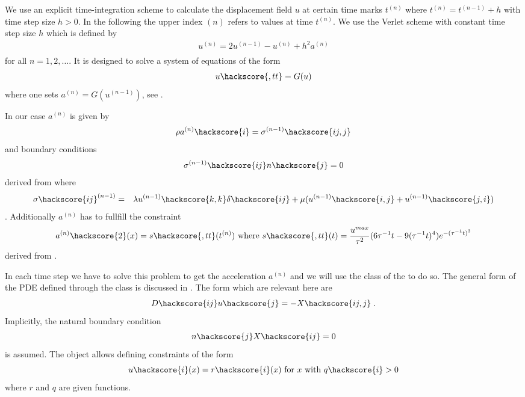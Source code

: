 We use an explicit time-integration scheme to calculate the displacement field $u$ at 
certain time marks $t^{(n)}$ where $t^{(n)}=t^{(n-1)}+h$ with time step size $h>0$. In the following the upper index ${(n)}$ refers to values at time $t^{(n)}$. We use the Verlet scheme  with constant time step size $h$
which is defined by
\begin{eqnarray} \label{WAVE dyn 2}
u^{(n)}=2u^{(n-1)}-u^{(n)} + h^2 a^{(n)} \\
\end{eqnarray}
for all $n=1,2,\ldots$. It is designed to solve a system of equations of the form
\begin{eqnarray} \label{WAVE dyn 2b} 
u\hackscore{,tt}=G(u)
\end{eqnarray}
where one sets $a^{(n)}=G(u^{(n-1)})$, see . 

In our case $a^{(n)}$ is given by
\begin{eqnarray}\label{WAVE dyn 3}
\rho a^{(n)}\hackscore{i}=\sigma^{(n-1)}\hackscore{ij,j}
\end{eqnarray}
and boundary conditions
\begin{eqnarray} \label{WAVE natural}
\sigma^{(n-1)}\hackscore{ij}n\hackscore{j}=0
\end{eqnarray}
derived from  where 
\begin{eqnarray} \label{WAVE dyn 3a}
\sigma\hackscore{ij}^{(n-1)} & = & \lambda u^{(n-1)}\hackscore{k,k} \delta\hackscore{ij} + \mu ( u^{(n-1)}\hackscore{i,j} + u^{(n-1)}\hackscore{j,i})
\end{eqnarray}.
Additionally $a^{(n)}$ has to fullfill the constraint
\begin{eqnarray}\label{WAVE dyn 4}
a^{(n)}\hackscore{2}(x)= s\hackscore{,tt}(t^{(n)})\mbox{ where } s\hackscore{,tt}(t)=\frac{u^{max}}{\tau^2}
(6\tau^{-1}t- 9(\tau^{-1}t)^4) e^{-(\tau^{-1}t)^3}  
\end{eqnarray}
derived from . 


In each time step we have to solve this problem to get the acceleration $a^{(n)}$ and we will
use the \LinearPDE class of the \linearPDEs to do so. The general form of the PDE defined through
the \LinearPDE class is discussed in . The form which are relevant here are  
\begin{equation}\label{WAVE dyn 100}
D\hackscore{ij} u\hackscore{j} = - X\hackscore{ij,j}\; .
\end{equation}
Implicitly, the natural boundary condition
\begin{equation}\label{WAVE dyn 101}
n\hackscore{j}X\hackscore{ij} =0 
\end{equation}
is assumed. The \LinearPDE object allows defining constraints of the form
\begin{equation}\label{WAVE dyn 101}
u\hackscore{i}(x)=r\hackscore{i}(x) \mbox{ for } x \mbox{ with } q\hackscore{i}>0
\end{equation}
where $r$ and $q$ are given functions.

